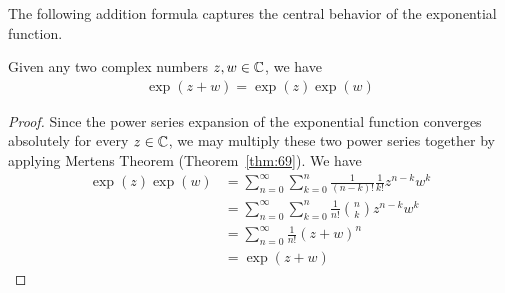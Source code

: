 \documentclass[thmcnt=section, 12pt]{my-elegantbook}
\begin{document}
The following addition formula 
captures the central behavior of 
the exponential function.

\begin{theorem} \label{thm:68}
    Given any two complex numbers $z, w \in \mathbb{C}$, we have 
	 \begin{align*}
	    \exp(z + w) = \exp(z) \exp(w)
	\end{align*}
\end{theorem}

\begin{proof}
	Since the power series expansion of the exponential function
	converges absolutely for every $z \in \mathbb{C}$, 
	we may multiply these two power series together
	by applying Mertens Theorem (Theorem~\ref{thm:69}).
	We have
	\begin{align*}
	    \exp(z) \exp(w)
		&= \sum_{n=0}^\infty \sum_{k=0}^n
		\frac{1}{(n-k)!} \frac{1}{k!} z^{n-k} w^k \\
		&= \sum_{n=0}^\infty \sum_{k=0}^n
		\frac{1}{n!} \binom{n}{k} z^{n-k} w^k \\
		&= \sum_{n=0}^\infty 
		\frac{1}{n!} (z+w)^n \\
		&= \exp(z+w)
	\end{align*}
\end{proof}


\printbibliography[heading=bibintoc, title=References]


\printindex

\end{document}
